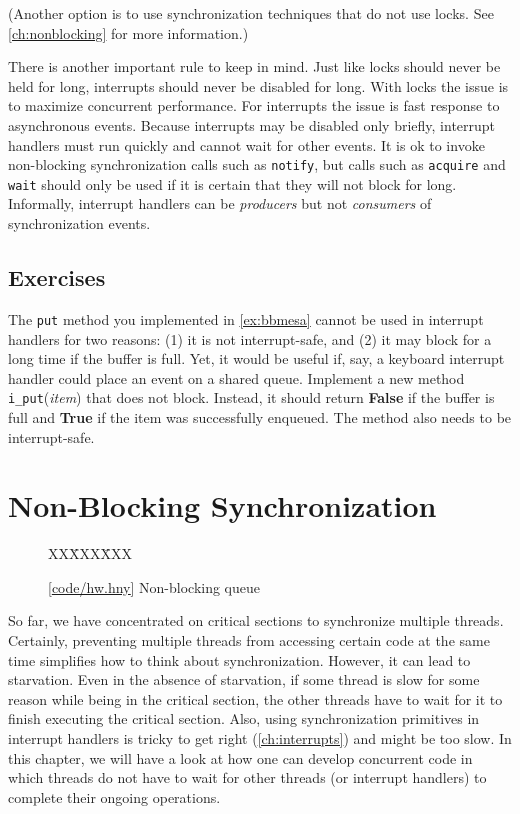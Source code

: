 \documentclass{report}
\newcommand{\harmonysource}[1]{
\begin{tabbing}
XX\=XXX\=XXX\kill
    
\end{tabbing}
}
\newcommand{\harmonylink}[1]{%
[\href{https://harmony.cs.cornell.edu/#1}{\underline{#1}}]%
}
\newenvironment{code}{
\tcolorbox
}{
\endtcolorbox
}
\begin{document}
(Another option is to use synchronization techniques that do not use locks.
See \autoref{ch:nonblocking} for more information.)

There is another important rule to keep in mind.  Just like locks should never be held
for long, interrupts should never be disabled for long.  With locks the issue is to
maximize concurrent performance.  For interrupts the issue is fast response to
asynchronous events.  Because interrupts may be disabled only briefly, interrupt
handlers must run quickly and cannot wait for other events.  It is ok to invoke
non-blocking synchronization calls such as \texttt{notify}, but calls such as
\texttt{acquire} and \texttt{wait} should only be used if it is certain that they will not
block for long.  Informally, interrupt handlers can be
\emph{producers} but not \emph{consumers} of synchronization events.

\section*{Exercises}
\begin{problems}
\item The \texttt{put} method you implemented in \autoref{ex:bbmesa} cannot be used
in interrupt handlers for two reasons: (1) it is not interrupt-safe, and (2)
it may block for a long time if the buffer is full.  Yet, it would be useful if,
say, a keyboard interrupt handler could place an event on a shared queue.
Implement a new method \texttt{i\_put}(\textit{item}) that does not
block.  Instead, it should return \textbf{False} if the buffer is full and \textbf{True}
if the item was successfully enqueued.
The method also needs to be interrupt-safe.
\end{problems}

\chapter{Non-Blocking Synchronization}
\label{ch:nonblocking}
%

%

\begin{figure}
\begin{code}
\harmonysource{hw}
\end{code}
\caption{\harmonylink{code/hw.hny} Non-blocking queue}
\label{fig:hw}
\end{figure}

So far, we have concentrated on critical sections to synchronize multiple
threads.  Certainly, preventing multiple threads from accessing
certain code at the same time simplifies how to think about synchronization.
However, it can lead to starvation.  Even in the absence of starvation,
if some thread is slow for some reason while being in the critical section,
the other threads have to wait for it to finish executing the critical section.
Also, using synchronization primitives in interrupt handlers is tricky
to get right (\autoref{ch:interrupts}) and might be too slow.
In this chapter, we will have a look at how one can develop concurrent
code in which threads do not have to wait for other threads (or interrupt
handlers) to complete their ongoing operations.
\end{document}
